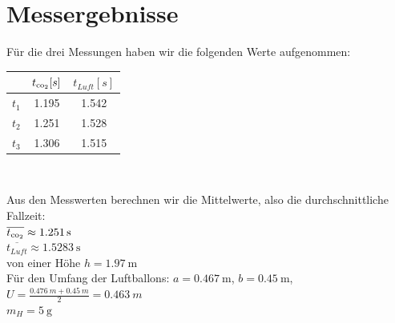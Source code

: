 \documentclass{article}
\begin{document}
    \section{Messergebnisse}
    Für die drei Messungen haben wir die folgenden Werte aufgenommen: \\
    \begin{center}
        \begin{tabular}{|c|c|c|}
            \hline
            & \( t_{\ce{co2}} [s] \) & \( t_{Luft} [s] \) \\
            \hline
            \( t_1 \) & 1.195 & 1.542 \\
            \hline
            \( t_2 \) & 1.251 & 1.528\\
            \hline
            \( t_3 \) & 1.306 & 1.515 \\
            \hline
            \end{tabular} \\
        \end{center}
        Aus den Messwerten berechnen wir die Mittelwerte, also die durchschnittliche Fallzeit: \\
        \( \overline{t_{\ce{co2}}} \approx \SI{1.251}{\second} \) \\
        \( \overline{t_{Luft}} \approx \SI{1.5283}{\second} \) \\
        von einer Höhe \( h = \SI{1.97}{\metre} \) \\
        Für den Umfang der Luftballons:
        \( a = \SI{0.467}{\metre} \), \( b = \SI{0.45}{\metre} \), \( U = \frac{ \SI{0.476}{m} + \SI{0.45}{m} }{2} = \SI{0.463}{m} \) \\
        \( m_H = \SI{5}{\gram} \) %
\end{document}
